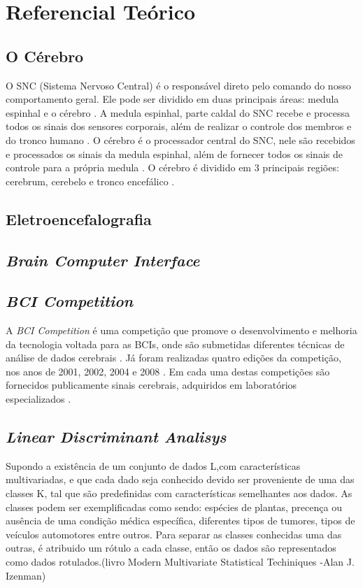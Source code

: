 
\chapter[Referencial Teórico]{Referencial Teórico}

\section{O Cérebro}
O SNC (Sistema Nervoso Central) é o responsável direto pelo comando do nosso comportamento geral\cite{David_Clarck}. Ele pode ser dividido em duas principais áreas: medula espinhal e o cérebro \cite{KANDEL}.
A medula espinhal, parte caldal do SNC recebe e processa todos os sinais dos sensores corporais, além de realizar o controle dos membros e do tronco humano \cite{KANDEL}.
O cérebro é o processador central do SNC, nele são recebidos e processados os sinais da medula espinhal, além de fornecer todos os sinais de controle para a própria medula \cite{KANDEL}. O cérebro é dividido em 3 principais regiões: cerebrum, cerebelo e tronco encefálico \cite{SIULYDissertacao}.
\section{Eletroencefalografia}

\section{\textit{Brain Computer Interface}}

\section{\textit{BCI Competition}}
A \textit{BCI Competition} é uma competição que promove o desenvolvimento e melhoria da tecnologia voltada para as BCIs, onde são submetidas diferentes técnicas de análise de dados cerebrais \cite{BCICompetition}. Já foram realizadas quatro edições da competição, nos anos de 2001, 2002, 2004 e 2008 \cite{BCICompetition}. Em cada uma destas competições são fornecidos publicamente sinais cerebrais, adquiridos em laboratórios especializados \cite{BCICompetition}.
 
\section{\textit{Linear Discriminant Analisys}}
Supondo a existência de um conjunto de dados L,com características multivariadas, e que cada dado
seja conhecido devido ser proveniente de uma das  classes K, tal que são predefinidas com características
semelhantes aos dados. As classes podem ser exemplificadas como sendo: espécies de plantas,
precença ou ausência de uma condição médica específica, diferentes tipos de tumores, tipos de veículos automotores
entre outros. Para separar as classes conhecidas uma das outras, é atribuido um rótulo a cada classe, então os dados são
representados como dados rotulados.(livro Modern Multivariate
Statistical Techiniques -Alan J. Izenman)


